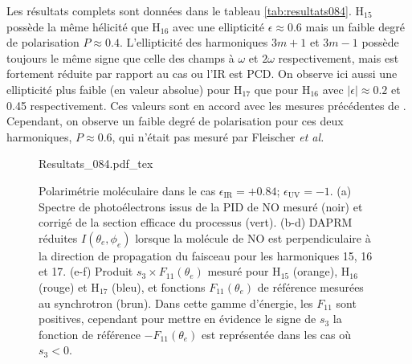 Les résultats complets sont données dans le tableau \ref{tab:resultats084}. H$_{15}$ possède la même hélicité que H$_{16}$ avec une ellipticité $\epsilon \approx 0.6$ mais un faible degré de polarisation $P \approx 0.4$. L'ellipticité des harmoniques $3m+1$ et $3m-1$ possède toujours le même signe que celle des champs à $\omega$ et $2\omega$ respectivement, mais est fortement réduite par rapport au cas ou l'IR est PCD. On observe ici aussi une ellipticité plus faible (en valeur absolue) pour H$_{17}$ que pour H$_{16}$ avec $|\epsilon| \approx 0.2$ et 0.45 respectivement. Ces valeurs sont en accord avec les mesures précédentes de . Cependant, on observe un faible degré de polarisation pour ces deux harmoniques, $P \approx 0.6$, qui n'était pas mesuré par Fleischer \textit{et al.}

\begin{figure}
\centering
\def\svgwidth{\textwidth}
{Resultats_084.pdf_tex}
\caption{Polarimétrie moléculaire dans le cas $\epsilon_{\text{IR}} = +0.84$; $\epsilon_{\text{UV}} = -1$. (a) Spectre de photoélectrons issus de la PID de NO mesuré (noir) et corrigé de la section efficace du processus (vert). (b-d) DAPRM réduites $I(\theta_e,\phi_e)$ lorsque la molécule de NO est perpendiculaire à la direction de propagation du faisceau pour les harmoniques 15, 16 et 17. (e-f) Produit $s_3 \times F_{11}(\theta_e)$ mesuré pour H$_{15}$ (orange), H$_{16}$ (rouge) et H$_{17}$ (bleu), et fonctions $F_{11}(\theta_e)$ de référence mesurées au synchrotron (brun). Dans cette gamme d'énergie, les $F_{11}$ sont positives, cependant pour mettre en évidence le signe de $s_3$ la fonction de référence $-F_{11}(\theta_e)$ est représentée dans les cas où $s_3 <0$.} 
\label{fig:Resultats_084}
\end{figure}